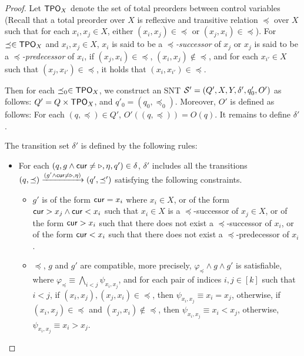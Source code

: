 \begin{appendix}
\begin{proof}
Let $\mathsf{TPO}_{X}$ denote the set of total preorders between control variables (Recall that a total preorder over $X$ is reflexive and transitive relation $\preceq$  over $X$ such that for each $x_i, x_j \in X$, either $(x_i, x_j) \in \preceq$ or $(x_j, x_i) \in \preceq$). For $\preceq \in \mathsf{TPO}_X$ and $x_i, x_j \in X$,  $x_i$ is said to be a \emph{$\preceq$-successor} of  $x_j$ or $x_j$ is said to be a \emph{$\preceq$-predecessor} of $x_i$, if $(x_j, x_i) \in \preceq$, $(x_i, x_j) \not \in \preceq$, and for each $x_{i'} \in X$ such that $(x_j, x_{i'}) \in \preceq$, it holds that $(x_i, x_{i'}) \in \preceq$. 

Then for each $\preceq_0 \in \mathsf{TPO}_X$, we construct an SNT ${\mathcal{S} }'= (Q', X, Y, \delta', q'_0, O')$ as follows: $Q'= Q \times \mathsf{TPO}_X$, and $q'_0=(q_0,  \preceq_0)$. Moreover, $O'$ is defined as follows: For each $(q, \preceq) \in Q'$, $O'((q, \preceq)) = O(q)$. It remains to define $\delta'$.

The transition set $\delta'$ is defined by the following rules:
\begin{itemize}
\item For each $(q, g \wedge \mathsf{cur} \neq \triangleright, \eta, q') \in \delta$, $\delta'$ includes all the transitions $(q, \preceq) \xrightarrow{(g' \wedge \mathsf{cur} \neq \triangleright, \eta)} (q', \preceq')$ satisfying the following constraints. 
\begin{itemize}
\item  $g'$ is of the form $\mathsf{cur} = x_i$ where $x_i \in X$, or of the form $\mathsf{cur} > x_j \wedge \mathsf{cur} < x_i$ such that $x_i \in X$ is a $\preceq$-successor of $x_j \in X$, or of the form $\mathsf{cur} > x_i$ such that there does not exist a $\preceq$-successor of $x_i$, or of the form $\mathsf{cur} < x_i$ such that there does not exist a $\preceq$-predecessor of $x_i$.
%
\item $\preceq$, $g$ and $g'$ are compatible, more precisely, $\varphi_{\preceq} \wedge g \wedge g'$ is satisfiable, where $\varphi_{\preceq} \equiv \bigwedge \limits_{ i< j} \psi_{x_i, x_j}$, and for each pair of indices $i, j \in [k]$ such that $i < j$,  if $(x_i, x_j), (x_j, x_i) \in \preceq$, then $\psi_{x_i, x_j} \equiv x_i = x_j$, otherwise, if $(x_i, x_j) \in \preceq$ and $(x_j, x_i) \not \in \preceq$, then $\psi_{x_i, x_j} \equiv x_i < x_j$, otherwise, $\psi_{x_i, x_j} \equiv x_i > x_j$. 


\end{itemize}
\end{itemize}
\end{proof}
\end{appendix}
